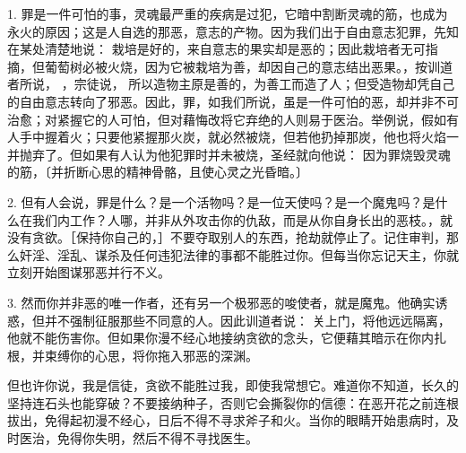 \par

1. 罪是一件可怕的事，灵魂最严重的疾病是过犯，它暗中割断灵魂的筋，也成为永火的原因；这是人自选的那恶，意志的产物。因为我们出于自由意志犯罪，先知在某处清楚地说： 栽培是好的，来自意志的果实却是恶的；因此栽培者无可指摘，但葡萄树必被火烧，因为它被栽培为善，却因自己的意志结出恶果。，按训道者所说， ，宗徒说， 所以造物主原是善的，为善工而造了人；但受造物却凭自己的自由意志转向了邪恶。因此，罪，如我们所说，虽是一件可怕的恶，却并非不可治愈；对紧握它的人可怕，但对藉悔改将它弃绝的人则易于医治。举例说，假如有人手中握着火；只要他紧握那火炭，就必然被烧，但若他扔掉那炭，他也将火焰一并抛弃了。但如果有人认为他犯罪时并未被烧，圣经就向他说： 因为罪烧毁灵魂的筋，〔并折断心思的精神骨骼，且使心灵之光昏暗。〕\par

2. 但有人会说，罪是什么？是一个活物吗？是一位天使吗？是一个魔鬼吗？是什么在我们内工作？人哪，并非从外攻击你的仇敌，而是从你自身长出的恶枝。，就没有贪欲。［保持你自己的，］不要夺取别人的东西，抢劫就停止了。记住审判，那么奸淫、淫乱、谋杀及任何违犯法律的事都不能胜过你。但每当你忘记天主，你就立刻开始图谋邪恶并行不义。\par

3. 然而你并非恶的唯一作者，还有另一个极邪恶的唆使者，就是魔鬼。他确实诱惑，但并不强制征服那些不同意的人。因此训道者说： 关上门，将他远远隔离，他就不能伤害你。但如果你漫不经心地接纳贪欲的念头，它便藉其暗示在你内扎根，并束缚你的心思，将你拖入邪恶的深渊。\par

但也许你说，我是信徒，贪欲不能胜过我，即使我常想它。难道你不知道，长久的坚持连石头也能穿破？不要接纳种子，否则它会撕裂你的信德：在恶开花之前连根拔出，免得起初漫不经心，日后不得不寻求斧子和火。当你的眼睛开始患病时，及时医治，免得你失明，然后不得不寻找医生。\par

